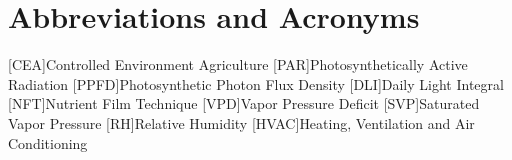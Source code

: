 \chapter{Abbreviations and Acronyms}
%
%
\begin{acronym}%
	[CEA]{Controlled Environment Agriculture}
	[PAR]{Photosynthetically Active Radiation}
	[PPFD]{Photosynthetic Photon Flux Density}
	[DLI]{Daily Light Integral}
	[NFT]{Nutrient Film Technique}
	[VPD]{Vapor Pressure Deficit}
	[SVP]{Saturated Vapor Pressure}
	[RH]{Relative Humidity}
	[HVAC]{Heating, Ventilation and Air Conditioning}
\end{acronym}
